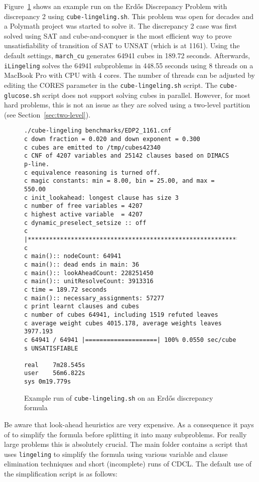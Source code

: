 \documentclass{llncs}
\begin{document}
Figure~\ref{fig:EDP} shows an example run on the Erd\H{o}s Discrepancy Problem with 
discrepancy 2 using {\tt cube-lingeling.sh}. This problem was open for 
decades and a Polymath project was started to solve it. The 
discrepancy 2 case was first solved using SAT and cube-and-conquer
is the most efficient way to prove unsatisfiability of transition of SAT
to UNSAT (which is at 1161). Using the default settings, {\tt march\_cu}
generates 64941 cubes in 189.72 seconds. Afterwards,  {\tt iLingeling}
solves the 64941 subproblems in 448.55 seconds using 8 threads
on a MacBook Pro with CPU with 4 cores. The number of threads can
be adjusted by editing the CORES parameter in the {\tt cube-lingeling.sh} script.
The {\tt cube-glucose.sh} script does not support solving cubes in parallel.
However, for most hard problems, this is not an issue as they are solved 
using a two-level partition (see Section~\ref{sec:two-level}).

\begin{figure}[h]
\centering
\begin{verbatim}
./cube-lingeling benchmarks/EDP2_1161.cnf
c down fraction = 0.020 and down exponent = 0.300
c cubes are emitted to /tmp/cubes42340
c CNF of 4207 variables and 25142 clauses based on DIMACS p-line.
c equivalence reasoning is turned off.
c magic constants: min = 8.00, bin = 25.00, and max = 550.00
c init_lookahead: longest clause has size 3
c number of free variables = 4207
c highest active variable  = 4207
c dynamic_preselect_setsize :: off
c |****************************************************************.|
c
c main():: nodeCount: 64941
c main():: dead ends in main: 36
c main():: lookAheadCount: 228251450
c main():: unitResolveCount: 3913316
c time = 189.72 seconds
c main():: necessary_assignments: 57277
c print learnt clauses and cubes
c number of cubes 64941, including 1519 refuted leaves
c average weight cubes 4015.178, average weights leaves 3977.193
c 64941 / 64941 |====================| 100% 0.0550 sec/cube 
s UNSATISFIABLE

real	7m28.545s
user	56m6.822s
sys	0m19.779s
\end{verbatim}
\caption{Example run of {\tt cube-lingeling.sh} on an Erd\H{o}s discrepancy formula}
\label{fig:EDP}
\end{figure}

Be aware that look-ahead heuristics are very expensive. As a consequence it pays of 
to simplify the formula before splitting it into many subproblems. For 
really large problems this is absolutely crucial. The main folder contains
a script that uses {\tt lingeling} to simplify the formula using various 
variable and clause elimination techniques and short (incomplete) runs of CDCL. 
The default use of the simplification script is as follows:
\end{document}
